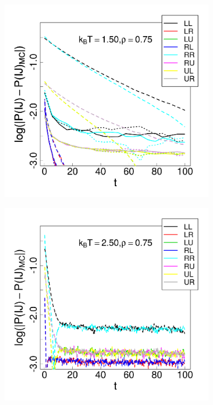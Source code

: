 \begin{figure}[h]
\begin{subfigure}[t]{0.45\textwidth}
	\captionsetup{justification=centering, width=0.9\columnwidth}
\end{subfigure}
\centering
\begin{subfigure}[t]{0.45\textwidth}
	\centering
	\includegraphics[width=\textwidth]{Images/relax_15_75.png}
	\captionsetup{justification=centering, width=0.9\columnwidth}
\end{subfigure}
\begin{subfigure}[t]{0.45\textwidth}
	\centering
	\includegraphics[width=\textwidth]{Images/relax_25_75.png}

\end{subfigure}
\end{figure}
